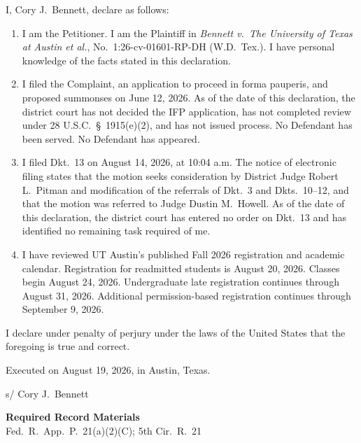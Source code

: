 \documentclass[14pt]{extarticle}
\renewcommand{\FilingDate}{August 19, 2026}
\begin{document}
I, Cory J.\ Bennett, declare as follows:

\begin{enumerate}
\item I am the Petitioner. I am the Plaintiff in \textit{Bennett v.\ The University of Texas at Austin et al.}, No.\ 1:26-cv-01601-RP-DH (W.D.\ Tex.). I have personal knowledge of the facts stated in this declaration.

\item I filed the Complaint, an application to proceed in forma pauperis, and proposed summonses on June 12, 2026. As of the date of this declaration, the district court has not decided the IFP application, has not completed review under 28 U.S.C.\ \S\ 1915(e)(2), and has not issued process. No Defendant has been served. No Defendant has appeared.

\item I filed Dkt.\ 13 on August 14, 2026, at 10:04 a.m. The notice of electronic filing states that the motion seeks consideration by District Judge Robert L.\ Pitman and modification of the referrals of Dkt.\ 3 and Dkts.\ 10--12, and that the motion was referred to Judge Dustin M.\ Howell. As of the date of this declaration, the district court has entered no order on Dkt.\ 13 and has identified no remaining task required of me.

\item I have reviewed UT Austin's published Fall 2026 registration and academic calendar. Registration for readmitted students is August 20, 2026. Classes begin August 24, 2026. Undergraduate late registration continues through August 31, 2026. Additional permission-based registration continues through September 9, 2026.
\end{enumerate}

\vspace{0.45em}
I declare under penalty of perjury under the laws of the United States that the foregoing is true and correct.

\vspace{0.45em}
Executed on \FilingDate, in Austin, Texas.

\vspace{0.7em}
\noindent s/ Cory J.\ Bennett

\clearpage
\thispagestyle{empty}
\vspace*{2.2in}
\begin{center}
{\LARGE\bfseries Required Record Materials}\\[0.7em]
{\large Fed.\ R.\ App.\ P.\ 21(a)(2)(C); 5th Cir.\ R.\ 21}
\end{center}
\end{document}
